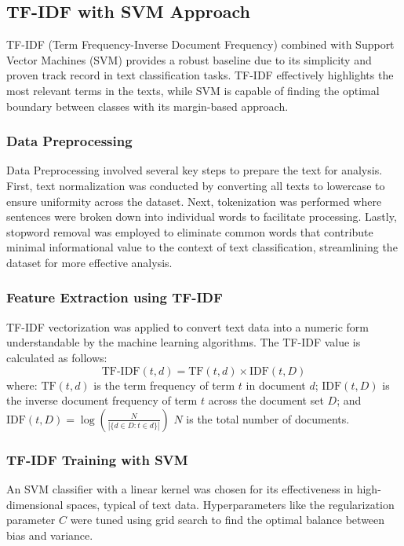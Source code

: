 \documentclass[twocolumn]{article}
\begin{document}
\subsection{{TF-IDF with SVM Approach}}
TF-IDF (Term Frequency-Inverse Document Frequency) combined with Support Vector Machines (SVM) provides a robust baseline due to its simplicity and proven track record in text classification tasks. TF-IDF effectively highlights the most relevant terms in the texts, while SVM is capable of finding the optimal boundary between classes with its margin-based approach.

\subsubsection*{Data Preprocessing}
Data Preprocessing involved several key steps to prepare the text for analysis. First, text normalization was conducted by converting all texts to lowercase to ensure uniformity across the dataset. Next, tokenization was performed where sentences were broken down into individual words to facilitate processing. Lastly, stopword removal was employed to eliminate common words that contribute minimal informational value to the context of text classification, streamlining the dataset for more effective analysis.

\subsubsection*{Feature Extraction using TF-IDF}
TF-IDF vectorization was applied to convert text data into a numeric form understandable by the machine learning algorithms. The TF-IDF value is calculated as follows:
\[ \text{TF-IDF}(t, d) = \text{TF}(t, d) \times \text{IDF}(t, D) \]
where:  \( \text{TF}(t, d) \) is the term frequency of term \( t \) in document \( d \);
\( \text{IDF}(t, D) \) is the inverse document frequency of term \( t \) across the document set \( D \); and
\( \text{IDF}(t, D) = \log \left(\frac{N}{|\{d \in D: t \in d\}|}\right) \)
\( N \) is the total number of documents.


\subsubsection*{TF-IDF Training with SVM}
An SVM classifier with a linear kernel was chosen for its effectiveness in high-dimensional spaces, typical of text data. Hyperparameters like the regularization parameter \( C \) were tuned using grid search to find the optimal balance between bias and variance.
\end{document}
